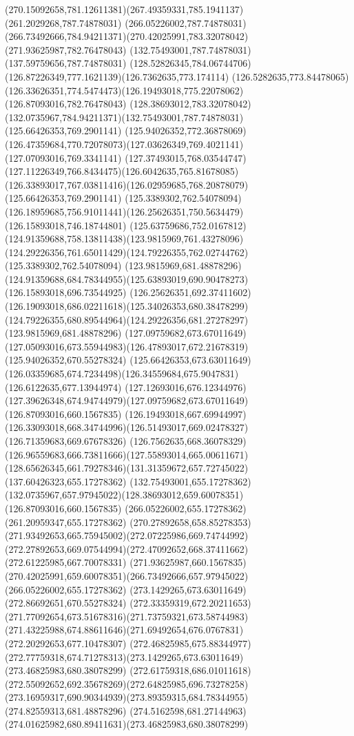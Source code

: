 {{	\curveto(270.15092658,781.12611381)(267.49359331,785.1941137)(261.2029268,787.74878031)
	\lineto(266.05226002,787.74878031)
	\curveto(266.73492666,784.94211371)(270.42025991,783.32078042)(271.93625987,782.76478043)
	\moveto(132.75493001,787.74878031)
	\lineto(137.59759656,787.74878031)
	\curveto(128.52826345,784.06744706)(126.87226349,777.1621139)(126.7362635,773.174114)
	\curveto(126.5282635,773.84478065)(126.33626351,774.5474473)(126.19493018,775.22078062)
	\lineto(126.87093016,782.76478043)
	\curveto(128.38693012,783.32078042)(132.0735967,784.94211371)(132.75493001,787.74878031)
	\moveto(125.66426353,769.2901141)
	\lineto(125.94026352,772.36878069)
	\curveto(126.47359684,770.72078073)(127.03626349,769.4021141)(127.07093016,769.3341141)
	\curveto(127.37493015,768.03544747)(127.11226349,766.8434475)(126.6042635,765.81678085)
	\curveto(126.33893017,767.03811416)(126.02959685,768.20878079)(125.66426353,769.2901141)
	\moveto(125.3389302,762.54078094)
	\curveto(126.18959685,756.91011441)(126.25626351,750.5634479)(126.15893018,746.18744801)
	\curveto(125.63759686,752.0167812)(124.91359688,758.13811438)(123.9815969,761.43278096)
	\curveto(124.29226356,761.65011429)(124.79226355,762.02744762)(125.3389302,762.54078094)
	\moveto(123.9815969,681.48878296)
	\curveto(124.91359688,684.78344955)(125.63893019,690.90478273)(126.15893018,696.73544925)
	\curveto(126.25626351,692.37411602)(126.19093018,686.02211618)(125.34026353,680.38478299)
	\curveto(124.79226355,680.89544964)(124.29226356,681.27278297)(123.9815969,681.48878296)
	\moveto(127.09759682,673.67011649)
	\curveto(127.05093016,673.55944983)(126.47893017,672.21678319)(125.94026352,670.55278324)
	\lineto(125.66426353,673.63011649)
	\curveto(126.03359685,674.7234498)(126.34559684,675.9047831)(126.6122635,677.13944974)
	\curveto(127.12693016,676.12344976)(127.39626348,674.94744979)(127.09759682,673.67011649)
	\moveto(126.87093016,660.1567835)
	\lineto(126.19493018,667.69944997)
	\curveto(126.33093018,668.34744996)(126.51493017,669.02478327)(126.71359683,669.67678326)
	\curveto(126.7562635,668.36078329)(126.96559683,666.73811666)(127.55893014,665.00611671)
	\curveto(128.65626345,661.79278346)(131.31359672,657.72745022)(137.60426323,655.17278362)
	\lineto(132.75493001,655.17278362)
	\curveto(132.0735967,657.97945022)(128.38693012,659.60078351)(126.87093016,660.1567835)
	\moveto(266.05226002,655.17278362)
	\lineto(261.20959347,655.17278362)
	\curveto(270.27892658,658.85278353)(271.93492653,665.75945002)(272.07225986,669.74744992)
	\curveto(272.27892653,669.07544994)(272.47092652,668.37411662)(272.61225985,667.70078331)
	\lineto(271.93625987,660.1567835)
	\curveto(270.42025991,659.60078351)(266.73492666,657.97945022)(266.05226002,655.17278362)
	\moveto(273.1429265,673.63011649)
	\lineto(272.86692651,670.55278324)
	\curveto(272.33359319,672.20211653)(271.77092654,673.51678316)(271.73759321,673.58744983)
	\curveto(271.43225988,674.88611646)(271.69492654,676.0767831)(272.20292653,677.10478307)
	\curveto(272.46825985,675.88344977)(272.77759318,674.71278313)(273.1429265,673.63011649)
	\moveto(273.46825983,680.38078299)
	\curveto(272.61759318,686.01011618)(272.55092652,692.35678269)(272.64825985,696.73278258)
	\curveto(273.16959317,690.90344939)(273.89359315,684.78344955)(274.82559313,681.48878296)
	\curveto(274.5162598,681.27144963)(274.01625982,680.89411631)(273.46825983,680.38078299)
}
}
